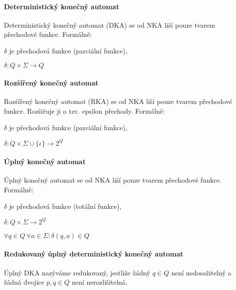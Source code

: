 \paragraph*{Deterministický konečný automat} Deterministický konečný automat (DKA) se od NKA liší pouze tvarem přechodové funkce. Formálně: \begin{compactitem}
    \item $\delta$ je přechodová funkce (parciální funkce), \begin{compactitem}
        \item $\delta : Q \times \Sigma \rightarrow Q$
    \end{compactitem}
\end{compactitem}

\paragraph*{Rozšířený konečný automat} Rozšířený konečný automat (RKA) se od NKA liší pouze tvarem přechodové funkce. Rozšiřuje ji o tzv. epsilon přechody. Formálně: \begin{compactitem}
    \item $\delta$ je přechodová funkce (parciální funkce), \begin{compactitem}
        \item $\delta : Q \times \Sigma \cup \{ \epsilon \} \rightarrow 2^Q$
    \end{compactitem}
\end{compactitem}

\paragraph*{Úplný konečný automat} Úplný konečný automat se od NKA liší pouze tvarem přechodové funkce. Formálně: \begin{compactitem}
    \item $\delta$ je přechodová funkce (totální funkce), \begin{compactitem}
        \item $\delta : Q \times \Sigma \rightarrow 2^Q$
        \item $\forall q \in Q ~ \forall a \in \Sigma : \delta(q, a) \in Q$
    \end{compactitem}
\end{compactitem}

\paragraph*{Redukovaný úplný deterministický konečný automat} Úplný DKA nazýváme redukovaný, jestliže žádný $q \in Q$ není nedosažitelný a žádná dvojice $p, q \in Q$ není nerozlišitelná.

